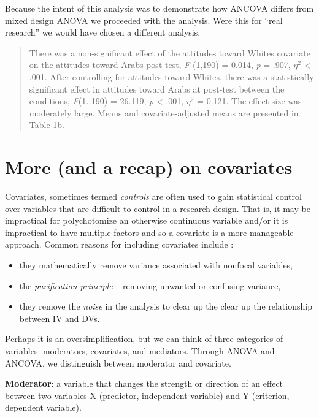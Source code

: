 \documentclass[
  11pt,
]{book}
\providecommand{\tightlist}{%
  \setlength{\itemsep}{0pt}\setlength{\parskip}{0pt}}
\begin{document}
Because the intent of this analysis was to demonstrate how ANCOVA differs from mixed design ANOVA we proceeded with the analysis. Were this for ``real research'' we would have chosen a different analysis.

\begin{quote}
There was a non-significant effect of the attitudes toward Whites covariate on the attitudes toward Arabs post-test, \emph{F} (1,190) = 0.014, \emph{p} = .907, \(\eta^2\) \textless{} .001. After controlling for attitudes toward Whites, there was a statistically significant effect in attitudes toward Arabs at post-test between the conditions, \emph{F}(1. 190) = 26.119, \emph{p} \textless{} .001, \(\eta^2\) = 0.121. The effect size was moderately large. Means and covariate-adjusted means are presented in Table 1b.
\end{quote}

\hypertarget{more-and-a-recap-on-covariates}{%
\section{More (and a recap) on covariates}\label{more-and-a-recap-on-covariates}}

Covariates, sometimes termed \emph{controls} are often used to gain statistical control over variables that are difficult to control in a research design. That is, it may be impractical for polychotomize an otherwise continuous variable and/or it is impractical to have multiple factors and so a covariate is a more manageable approach. Common reasons for including covariates include \citep{bernerth_critical_2016}:

\begin{itemize}
\tightlist
\item
  they mathematically remove variance associated with nonfocal variables,
\item
  the \emph{purification principle} -- removing unwanted or confusing variance,
\item
  they remove the \emph{noise} in the analysis to clear up the clear up the relationship between IV and DVs.
\end{itemize}

Perhaps it is an oversimplification, but we can think of three categories of variables: moderators, covariates, and mediators. Through ANOVA and ANCOVA, we distinguish between moderator and covariate.

\textbf{Moderator}: a variable that changes the strength or direction of an effect between two variables X (predictor, independent variable) and Y (criterion, dependent variable).
\end{document}
